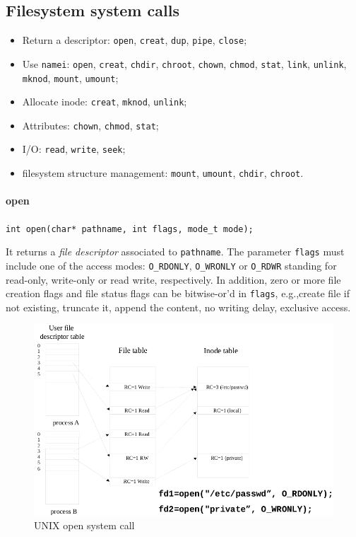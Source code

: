 \subsection{Filesystem system calls}
\begin{itemize}
\item Return a descriptor: \texttt{open}, \texttt{creat}, \texttt{dup}, \texttt{pipe}, \texttt{close};
\item Use \texttt{namei}: \texttt{open}, \texttt{creat}, \texttt{chdir}, \texttt{chroot}, \texttt{chown}, \texttt{chmod}, \texttt{stat}, \texttt{link}, \texttt{unlink}, \texttt{mknod}, \texttt{mount}, \texttt{umount};
\item Allocate inode: \texttt{creat}, \texttt{mknod}, \texttt{unlink};
\item Attributes: \texttt{chown}, \texttt{chmod}, \texttt{stat};
\item I/O: \texttt{read}, \texttt{write}, \texttt{seek};
\item filesystem structure management: \texttt{mount}, \texttt{umount}, \texttt{chdir}, \texttt{chroot}.
\end{itemize}

\paragraph{open}
\texttt{int open(char* pathname, int flags, mode\_t mode);}

It returns a \emph{file descriptor} associated to \texttt{pathname}. The parameter \texttt{flags} must include one of the access modes: \texttt{O\_RDONLY}, \texttt{O\_WRONLY} or \texttt{O\_RDWR} standing for read-only, write-only or read write, respectively. In addition, zero or more file creation flags and file status flags can be bitwise-or'd in \texttt{flags}, e.g.,\@ create file if not existing, truncate it, append the content, no writing delay, exclusive access.

\begin{figure}[hbtp]
\centering
\includegraphics[scale=0.3]{images/file_system/open_system_call.jpg}
\caption{UNIX open system call}
\end{figure}

